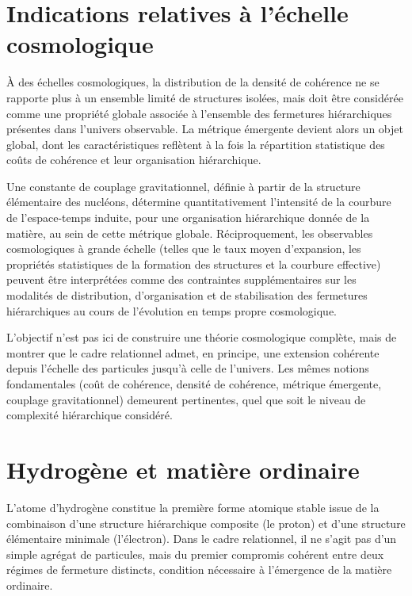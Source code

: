 \documentclass[11pt,a4paper]{article}
\begin{document}
\section{Indications relatives à l’échelle cosmologique}

À des échelles cosmologiques, la distribution de la densité de cohérence ne se rapporte plus à un ensemble limité de structures isolées, mais doit être considérée comme une propriété globale associée à l’ensemble des fermetures hiérarchiques présentes dans l’univers observable. La métrique émergente devient alors un objet global, dont les caractéristiques reflètent à la fois la répartition statistique des coûts de cohérence et leur organisation hiérarchique.

Une constante de couplage gravitationnel, définie à partir de la structure élémentaire des nucléons, détermine quantitativement l’intensité de la courbure de l’espace-temps induite, pour une organisation hiérarchique donnée de la matière, au sein de cette métrique globale. Réciproquement, les observables cosmologiques à grande échelle (telles que le taux moyen d’expansion, les propriétés statistiques de la formation des structures et la courbure effective) peuvent être interprétées comme des contraintes supplémentaires sur les modalités de distribution, d’organisation et de stabilisation des fermetures hiérarchiques au cours de l’évolution en temps propre cosmologique.

L’objectif n’est pas ici de construire une théorie cosmologique complète, mais de montrer que le cadre relationnel admet, en principe, une extension cohérente depuis l’échelle des particules jusqu’à celle de l’univers. Les mêmes notions fondamentales (coût de cohérence, densité de cohérence, métrique émergente, couplage gravitationnel) demeurent pertinentes, quel que soit le niveau de complexité hiérarchique considéré.

\section{Hydrogène et matière ordinaire}

L’atome d’hydrogène constitue la première forme atomique stable issue de la combinaison d’une structure hiérarchique composite (le proton) et d’une structure élémentaire minimale (l’électron). Dans le cadre relationnel, il ne s’agit pas d’un simple agrégat de particules, mais du premier compromis cohérent entre deux régimes de fermeture distincts, condition nécessaire à l’émergence de la matière ordinaire.
\end{document}
